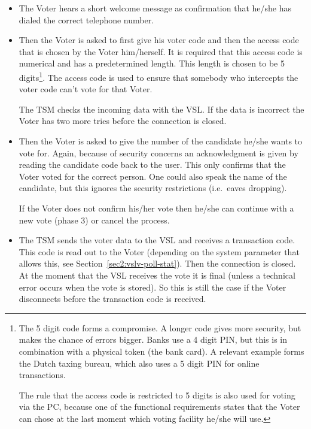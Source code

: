\begin{itemize}
	\item The Voter hears a short welcome message as confirmation
	that he/she has dialed the correct telephone number.

	\item Then the Voter is asked to first give his voter code and
	then the access code that is chosen by the Voter
	him/herself. It is required that this access code is numerical
	and has a predetermined length. This length is chosen to be 5
	digits\footnote{The 5 digit code forms a compromise. A longer
	code gives more security, but makes the chance of errors
	bigger. Banks use a 4 digit PIN, but this is in combination
	with a physical token (the bank card). A relevant example
	forms the Dutch taxing bureau, which also uses a 5 digit PIN
	for online transactions.

	The rule that the access code is restricted to 5 digits is
	also used for voting via the PC, because one of the functional
	requirements states that the Voter can chose at the last
	moment which voting facility he/she will use.}. The access
	code is used to ensure that somebody who intercepts the voter
	code can't vote for that Voter.

	The TSM checks the incoming data with the VSL. If the data is
	incorrect the Voter has two more tries before the connection
	is closed.
	
	\item Then the Voter is asked to give the number of the
	candidate he/she wants to vote for. Again, because of security
	concerns an acknowledgment is given by reading the candidate
	code back to the user. This only confirms that the Voter voted
	for the correct person. One could also speak the name of the
	candidate, but this ignores the security restrictions (i.e.\
	eaves dropping). 
	
	If the Voter does not confirm his/her vote then he/she can
	continue with a new vote (phase 3) or cancel the process.

	\item The TSM sends the voter data to the VSL and receives a
	transaction code. This code is read out to the Voter
	(depending on the system parameter that allows this, see
	Section~\ref{sec2:vslv-poll-stat}). Then the connection is
	closed. At the moment that the VSL receives the vote it is
	final (unless a technical error occurs when the vote is
	stored). So this is still the case if the Voter disconnects
	before the transaction code is received.
	

\end{itemize}

